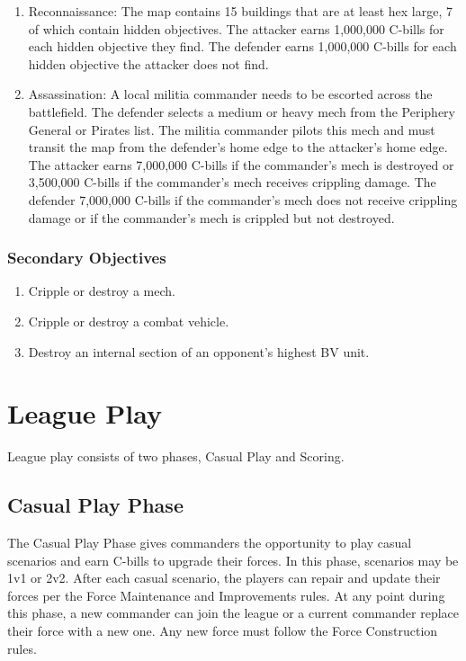 \documentclass[UTF8]{article}
\begin{document}
\begin{enumerate}
\item Reconnaissance: The map contains 15 buildings that are at least hex large, 7 of which contain hidden objectives.
The attacker earns 1,000,000 C-bills for each hidden objective they find. 
The defender earns 1,000,000 C-bills for each hidden objective the attacker does not find.

\item Assassination: A local militia commander needs to be escorted across the battlefield.
The defender selects a medium or heavy mech from the Periphery General or Pirates list.
The militia commander pilots this mech and must transit the map from the defender's home edge to the attacker's home edge.
The attacker earns 7,000,000 C-bills if the commander's mech is destroyed or 3,500,000 C-bills if the commander's mech receives crippling damage.
The defender 7,000,000 C-bills if the commander's mech does not receive crippling damage or if the commander's mech is crippled but not destroyed.

\end{enumerate}

\subsubsection{Secondary Objectives}

\begin{enumerate}

\item Cripple or destroy a mech.

\item Cripple or destroy a combat vehicle.

\item Destroy an internal section of an opponent's highest BV unit.

\end{enumerate}

\newpage

\section{League Play}

League play consists of two phases, Casual Play and Scoring.

\subsection{Casual Play Phase}

The Casual Play Phase gives commanders the opportunity to play casual scenarios and earn C-bills to upgrade their forces.
In this phase, scenarios may be 1v1 or 2v2.
After each casual scenario, the players can repair and update their forces per the Force Maintenance and Improvements rules.
At any point during this phase, a new commander can join the league or a current commander replace their force with a new one.
Any new force must follow the Force Construction rules.\\
\end{document}
